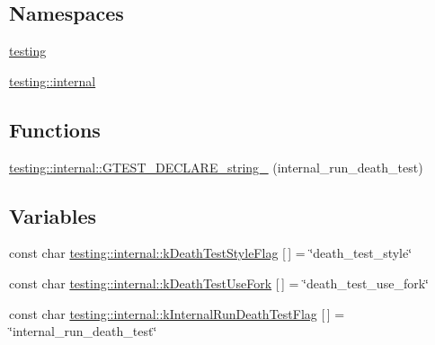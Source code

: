 \subsection*{Namespaces}
\begin{DoxyCompactItemize}
\item 
 \hyperlink{namespacetesting}{testing}
\item 
 \hyperlink{namespacetesting_1_1internal}{testing\+::internal}
\end{DoxyCompactItemize}
\subsection*{Functions}
\begin{DoxyCompactItemize}
\item 
\hyperlink{namespacetesting_1_1internal_ac20f635c3285878fc1195ce687f23950}{testing\+::internal\+::\+G\+T\+E\+S\+T\+\_\+\+D\+E\+C\+L\+A\+R\+E\+\_\+string\+\_\+} (internal\+\_\+run\+\_\+death\+\_\+test)
\end{DoxyCompactItemize}
\subsection*{Variables}
\begin{DoxyCompactItemize}
\item 
const char \hyperlink{namespacetesting_1_1internal_a008ebfe0c0347d65e5e06e4d310981b3}{testing\+::internal\+::k\+Death\+Test\+Style\+Flag} \mbox{[}$\,$\mbox{]} = \char`\"{}death\+\_\+test\+\_\+style\char`\"{}
\item 
const char \hyperlink{namespacetesting_1_1internal_a32051e2574562b548be3e26a52eaa553}{testing\+::internal\+::k\+Death\+Test\+Use\+Fork} \mbox{[}$\,$\mbox{]} = \char`\"{}death\+\_\+test\+\_\+use\+\_\+fork\char`\"{}
\item 
const char \hyperlink{namespacetesting_1_1internal_a8572303d929880adf30db00952e1c45d}{testing\+::internal\+::k\+Internal\+Run\+Death\+Test\+Flag} \mbox{[}$\,$\mbox{]} = \char`\"{}internal\+\_\+run\+\_\+death\+\_\+test\char`\"{}
\end{DoxyCompactItemize}
